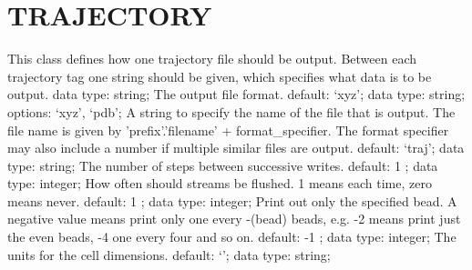 \section{TRAJECTORY}
\label{TRAJECTORY}
\begin{ipifield}{}%
{This class defines how one trajectory file should be output. Between each trajectory tag one string should be given, which specifies what data is to be output.}%
{data type: string; }%
{%
{The output file format.}%
{default: `xyz'; data type: string; options: `xyz', `pdb'; }%
%
{A string to specify the name of the file that is output. The file name is given by 'prefix'.'filename' + format\_specifier. The format specifier may also include a number if multiple similar files are output.}%
{default: `traj'; data type: string; }%
%
{The number of steps between successive writes.}%
{default:  1 ; data type: integer; }%
%
{How often should streams be flushed. 1 means each time, zero means never.}%
{default:  1 ; data type: integer; }%
%
{Print out only the specified bead. A negative value means print only one every -(bead) beads, e.g. -2 means print just the even beads, -4 one every four and so on.}%
{default:  -1 ; data type: integer; }%
%
{The units for the cell dimensions.}%
{default: `'; data type: string; }%
}
\end{ipifield}
